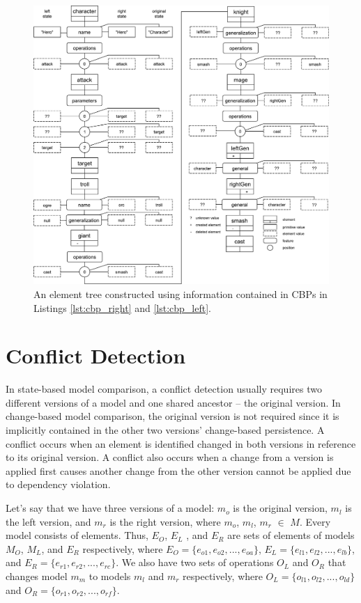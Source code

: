 \begin{figure}
    \centering
    \includegraphics[width=\linewidth]{element_tree_game}
    \caption{An element tree constructed using information contained in CBPs in Listings \ref{lst:cbp_right} and \ref{lst:cbp_left}.}
    \label{fig:element_tree_game}
\end{figure} 

\section{Conflict Detection}
\label{sec:conflict_detection}
In state-based model comparison, a conflict detection usually requires two different versions of a model and one shared ancestor -- the original version. In change-based model comparison, the original version is not required since it is implicitly contained in the other two versions' change-based persistence. A conflict occurs when an element is identified changed in both versions in reference to its original version. A conflict also occurs when a change from a version is applied first causes another change from the other version cannot be applied due to dependency violation. 

Let's say that we have three versions of a model: $m_{o}$ is the original version, $m_{l}$ is the left version, and $m_{r}$ is the right version, where $m_{o}$, $m_{l}$, $m_{r}$ $\in$ $M$. 
Every model consists of elements. Thus, $E_{O}$, $E_{L}$ , and $E_{R}$ are sets of elements of models $M_{O}$, $M_{L}$, and $E_{R}$ respectively, where $E_{O}=\{e_{o1}, e_{o2}, ..., e_{oa}\}$, $E_{L}=\{e_{l1}, e_{l2}, ..., e_{lb}\}$, and $E_{R}=\{e_{r1}, e_{r2}, ..., e_{rc}\}$. We also have two sets of operations $O_{L}$ and $O_{R}$ that changes model $m_{m}$ to models $m_{l}$ and $m_{r}$ respectively, where $O_{L}=\{o_{l1}, o_{l2}, ..., o_{ld}\}$ and $O_{R}=\{o_{r1}, o_{r2}, ..., o_{rf}\}$. 

